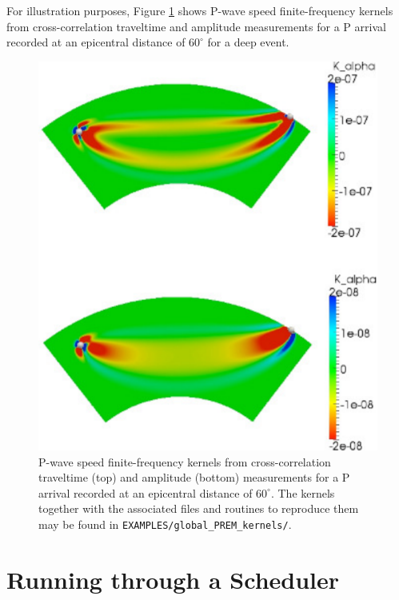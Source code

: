 \documentclass[oneside,english]{book}
\begin{document}
For illustration purposes, Figure \ref{fig:P-wave-speed-finite-frequency}
shows P-wave speed finite-frequency kernels from cross-correlation traveltime and amplitude measurements for a P arrival recorded at an epicentral distance of $60^{\circ}$ for a deep event. 

%
\begin{figure}[H]
\noindent \begin{centering}
\includegraphics[clip,scale=1.2]{figures/P_alpha_60d_17s}
\caption{\label{fig:P-wave-speed-finite-frequency}P-wave speed finite-frequency
kernels from cross-correlation traveltime (top) and amplitude (bottom) measurements for a P arrival recorded at an epicentral distance of $60^{\circ}$. The kernels together with the associated files and routines to reproduce them may be found in \texttt{EXAMPLES/global\_PREM\_kernels/}.}
\par\end{centering}
\end{figure}



\chapter{\label{cha:Running-Scheduler}Running through a Scheduler}
\end{document}
